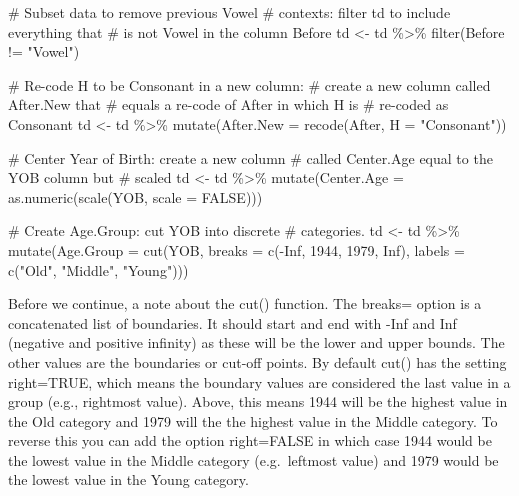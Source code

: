 \documentclass[
  12pt,
  letterpaper]{article}
\newenvironment{Shaded}{\begin{snugshade}}{\end{snugshade}}
\newcommand{\AttributeTok}[1]{\textcolor[rgb]{0.40,0.45,0.13}{#1}}
\newcommand{\CommentTok}[1]{\textcolor[rgb]{0.37,0.37,0.37}{#1}}
\newcommand{\ConstantTok}[1]{\textcolor[rgb]{0.56,0.35,0.01}{#1}}
\newcommand{\DecValTok}[1]{\textcolor[rgb]{0.68,0.00,0.00}{#1}}
\newcommand{\FunctionTok}[1]{\textcolor[rgb]{0.28,0.35,0.67}{#1}}
\newcommand{\NormalTok}[1]{\textcolor[rgb]{0.00,0.23,0.31}{#1}}
\newcommand{\OtherTok}[1]{\textcolor[rgb]{0.00,0.23,0.31}{#1}}
\newcommand{\SpecialCharTok}[1]{\textcolor[rgb]{0.37,0.37,0.37}{#1}}
\newcommand{\StringTok}[1]{\textcolor[rgb]{0.13,0.47,0.30}{#1}}
\renewcommand\texttt[1]{{\ttfamily\color{BrickRed}#1}}
\begin{document}
\begin{Shaded}
\begin{Highlighting}[]
\CommentTok{\# Subset data to remove previous \textquotesingle{}Vowel\textquotesingle{}}
\CommentTok{\# contexts: filter td to include everything that}
\CommentTok{\# is not \textquotesingle{}Vowel\textquotesingle{} in the column Before}
\NormalTok{td }\OtherTok{\textless{}{-}}\NormalTok{ td }\SpecialCharTok{\%\textgreater{}\%}
    \FunctionTok{filter}\NormalTok{(Before }\SpecialCharTok{!=} \StringTok{"Vowel"}\NormalTok{)}

\CommentTok{\# Re{-}code \textquotesingle{}H\textquotesingle{} to be \textquotesingle{}Consonant\textquotesingle{} in a new column:}
\CommentTok{\# create a new column called After.New that}
\CommentTok{\# equals a re{-}code of After in which H is}
\CommentTok{\# re{-}coded as Consonant}
\NormalTok{td }\OtherTok{\textless{}{-}}\NormalTok{ td }\SpecialCharTok{\%\textgreater{}\%}
    \FunctionTok{mutate}\NormalTok{(}\AttributeTok{After.New =} \FunctionTok{recode}\NormalTok{(After, }\AttributeTok{H =} \StringTok{"Consonant"}\NormalTok{))}

\CommentTok{\# Center Year of Birth: create a new column}
\CommentTok{\# called Center.Age equal to the YOB column but}
\CommentTok{\# scaled}
\NormalTok{td }\OtherTok{\textless{}{-}}\NormalTok{ td }\SpecialCharTok{\%\textgreater{}\%}
    \FunctionTok{mutate}\NormalTok{(}\AttributeTok{Center.Age =} \FunctionTok{as.numeric}\NormalTok{(}\FunctionTok{scale}\NormalTok{(YOB, }\AttributeTok{scale =} \ConstantTok{FALSE}\NormalTok{)))}

\CommentTok{\# Create Age.Group: cut YOB into discrete}
\CommentTok{\# categories.}
\NormalTok{td }\OtherTok{\textless{}{-}}\NormalTok{ td }\SpecialCharTok{\%\textgreater{}\%}
    \FunctionTok{mutate}\NormalTok{(}\AttributeTok{Age.Group =} \FunctionTok{cut}\NormalTok{(YOB, }\AttributeTok{breaks =} \FunctionTok{c}\NormalTok{(}\SpecialCharTok{{-}}\ConstantTok{Inf}\NormalTok{, }\DecValTok{1944}\NormalTok{,}
        \DecValTok{1979}\NormalTok{, }\ConstantTok{Inf}\NormalTok{), }\AttributeTok{labels =} \FunctionTok{c}\NormalTok{(}\StringTok{"Old"}\NormalTok{, }\StringTok{"Middle"}\NormalTok{, }\StringTok{"Young"}\NormalTok{)))}
\end{Highlighting}
\end{Shaded}

Before we continue, a note about the \texttt{cut()} function. The
\texttt{breaks=} option is a concatenated list of boundaries. It should
start and end with \texttt{-Inf} and \texttt{Inf} (negative and positive
infinity) as these will be the lower and upper bounds. The other values
are the boundaries or cut-off points. By default \texttt{cut()} has the
setting \texttt{right=TRUE}, which means the boundary values are
considered the last value in a group (e.g., rightmost value). Above,
this means \texttt{1944} will be the highest value in the \texttt{Old}
category and \texttt{1979} will the the highest value in the
\texttt{Middle} category. To reverse this you can add the option
\texttt{right=FALSE} in which case 1944 would be the lowest value in the
\texttt{Middle} category (e.g.~leftmost value) and 1979 would be the
lowest value in the \texttt{Young} category.
\end{document}
